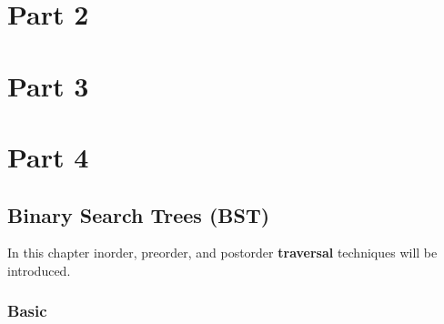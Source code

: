 \documentclass[11pt,fleqn]{book}
\begin{document}
\part{Part 2}





\part{Part 3}


\part{Part 4}

\chapter{Binary Search Trees (BST)}
In this chapter inorder, preorder, and postorder \textbf{traversal} techniques will be introduced. 
\section{Basic}
\end{document}
